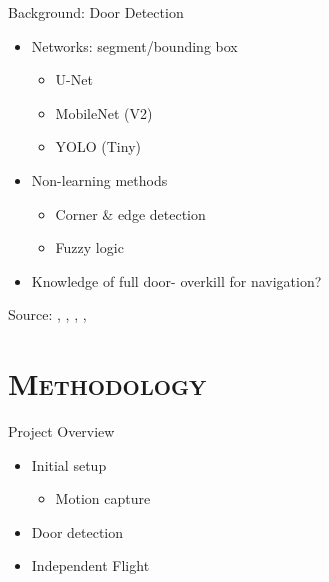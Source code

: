 \documentclass[xcolor=x11names,compress]{beamer}
\begin{document}
\begin{frame}{Background: Door Detection}
	\begin{itemize}
		\item Networks: segment/bounding box
		\begin{itemize}
            \item U-Net
            \item MobileNet (V2)
            \item YOLO (Tiny)
		\end{itemize}
		\item Non-learning methods
		\begin{itemize}
            \item Corner \& edge detection
            \item Fuzzy logic
		\end{itemize}
		\item Knowledge of full door- overkill for navigation?
	\end{itemize}
    \tiny{Source: \cite{parallelogram}, \cite{Unet}, \cite{howard2017mobilenets}, \cite{Fuzzy}, \cite{yolov3} }
\end{frame}


\section{\scshape Methodology}



\begin{frame}{Project Overview}
	\vspace{-10pt}
	\begin{itemize}
		\item Initial setup
		\begin{itemize}
			\item Motion capture
		\end{itemize}
		\item Door detection
		\item Independent Flight
	\end{itemize}
\end{frame}
\end{document}
